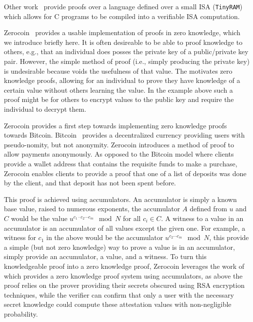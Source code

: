 Other work~\cite{ben2013snarks} provide proofs over a language defined over a
small ISA (\texttt{TinyRAM}) which allows for C programs to be compiled into a
verifiable ISA computation.

Zerocoin~\cite{miers2013zerocoin} provides a usable implementation of proofs in
zero knowledge, which we introduce briefly here. It is often desireable to be
able to proof knowledge to others, e.g., that an individual does posses the
private key of a public/private key pair. However, the simple method of proof
(i.e., simply producing the private key) is undesirable because voids the
usefulness of that value. The motivates zero knowledge proofs, allowing for an
individual to prove they have knowledge of a certain value without others
learning the value. In the example above such a proof might be for others to
encrypt values to the public key and require the individual to decrypt them.

Zerocoin provides a first step towards implementing zero knowledge proofs
towards Bitcoin. Bitcoin~\cite{nakamoto2008bitcoin} provides a decentralized
currency providing users with pseudo-nomity, but not anonymity. Zerocoin
introduces a method of proof to allow payments anonymously. As opposed to the
Bitcoin model where clients provide a wallet address that contains the requisite
funds to make a purchase, Zerocoin enables clients to provide a proof that one
of a list of deposits was done by the client, and that deposit has not been
spent before.

This proof is achieved using accumulators. An accumulator is simply a known base
value, raised to numerous exponents, the accumulator $A$ defined from  $u$ and
$C$ would be the value $u^{c_1\cdot c_2\cdots c_m} \mod N$ for all $c_i\in C$. A
witness to a value in an accumulator is an accumulator of all values except the
given one. For example, a witness for $c_1$ in the above would be the
accumulator $u^{c_2\cdots c_m}\mod N$, this provide a simple (but not zero
knowledge) way to prove a value is in an accumulator, simply provide an
accumulator, a value, and a witness. To turn this knowledgeable proof into a
zero knowledge proof, Zerocoin leverages the work of \cite{camenisch2002dynamic}
which provides a zero knowledge proof system using accumulators, as above the
proof relies on the prover providing their secrets obscured using RSA encryption
techniques, while the verifier can confirm that only a user with the necessary
secret knowledge could compute these attestation values with non-negligible
probability.